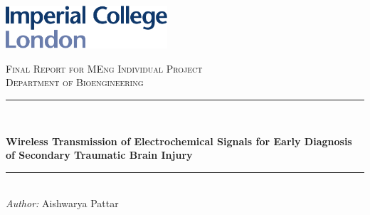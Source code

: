 \begin{titlepage}

\newcommand{\HRule}{\rule{\linewidth}{0.5mm}} %



\includegraphics[width = 6cm]{./figures/imperial}\\[0.5cm] 

\begin{center} %


\vspace{1.25cm}
\textsc{\Large Final Report for MEng Individual Project}\\[0.5cm] 
\textsc{\large Department of Bioengineering}\\[0.5cm] 

\HRule \\[0.4cm]

\begin{spacing}{1.5}
{ \LARGE \bfseries Wireless Transmission of Electrochemical Signals for Early Diagnosis of Secondary Traumatic Brain Injury }\\
\end{spacing}

\HRule \\[1.5cm]


\large
\textit{Author:}
Aishwarya Pattar


\end{center}
\end{titlepage}
